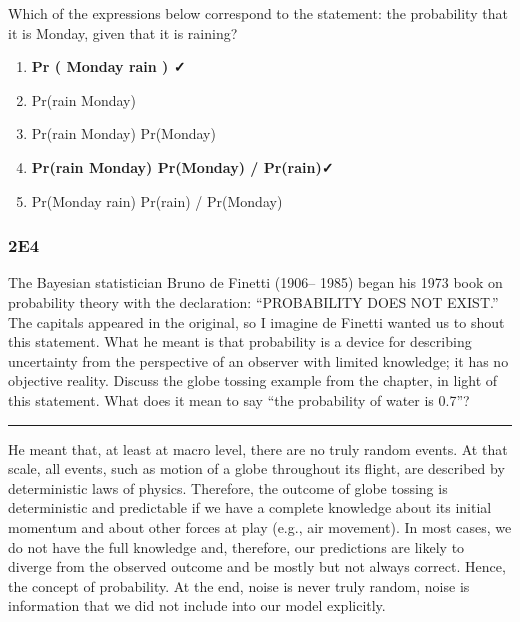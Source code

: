\documentclass[
]{book}
\providecommand{\tightlist}{%
  \setlength{\itemsep}{0pt}\setlength{\parskip}{0pt}}
\begin{document}
Which of the expressions below correspond to the statement: the probability that it is Monday, given that it is raining?

\begin{enumerate}
\def\labelenumi{\arabic{enumi}.}
\tightlist
\item
  \textbf{Pr ( Monday \textbar{} rain ) ✓}
\item
  Pr(rain \textbar{} Monday)
\item
  Pr(rain \textbar{} Monday) Pr(Monday)
\item
  \textbf{Pr(rain \textbar{} Monday) Pr(Monday) / Pr(rain)✓}
\item
  Pr(Monday \textbar{} rain) Pr(rain) / Pr(Monday)
\end{enumerate}

\hypertarget{e4}{%
\subsubsection*{2E4}\label{e4}}

The Bayesian statistician Bruno de Finetti (1906-- 1985) began his 1973 book on probability theory with the declaration: ``PROBABILITY DOES NOT EXIST.'' The capitals appeared in the original, so I imagine de Finetti wanted us to shout this statement. What he meant is that probability is a device for describing uncertainty from the perspective of an observer with limited knowledge; it has no objective reality. Discuss the globe tossing example from the chapter, in light of this statement. What does it mean to say ``the probability of water is 0.7''?

\begin{center}\rule{0.5\linewidth}{0.5pt}\end{center}

He meant that, at least at macro level, there are no truly random events. At that scale, all events, such as motion of a globe throughout its flight, are described by deterministic laws of physics. Therefore, the outcome of globe tossing is deterministic and predictable if we have a complete knowledge about its initial momentum and about other forces at play (e.g., air movement). In most cases, we do not have the full knowledge and, therefore, our predictions are likely to diverge from the observed outcome and be mostly but not always correct. Hence, the concept of probability. At the end, noise is never truly random, noise is information that we did not include into our model explicitly.
\end{document}
